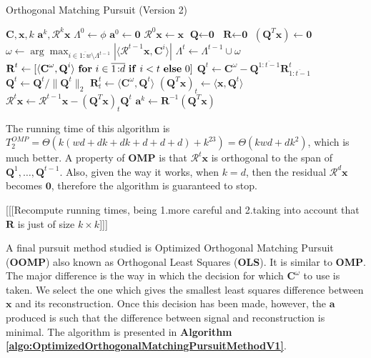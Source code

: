 \documentclass[12pt,a4paper,oneside,english]{UPBThesis}
\newcommand{\hctimes}[2]{{#1}\!\times\!{#2}}
\newcommand{\hcrange}[2]{\overline{{#1}\colon\!\!{#2}}}
\begin{document}
\begin{algorithm}
\caption{Orthogonal Matching Pursuit (Version 2)}
\label{algo:OrthogonalMatchingPursuitMethodV2}
\begin{algorithmic}
\Require $\textbf{C},\textbf{x},k$
\Ensure $\textbf{a}^k,\mathcal{R}^k\textbf{x}$
\State $\Lambda^0 \gets \phi$
\State $\textbf{a}^0 \gets \textbf{0}$
\State $\mathcal{R}^0\textbf{x} \gets \textbf{x}$
\State $\textbf{Q} \gets \textbf{0}$
\State $\textbf{R} \gets \textbf{0}$
\State $(\textbf{Q}^T\textbf{x}) \gets \textbf{0}$
\For {$t = \hcrange{1}{k}$}
\State $\omega \gets \arg \max_{i \in \hcrange{1}{w} \setminus \Lambda^{t-1}} \left| \langle \mathcal{R}^{t-1}\textbf{x} , \textbf{C}^i \rangle \right|$
\State $\Lambda^t \gets \Lambda^{t-1} \cup \omega$
\State $\textbf{R}^t \gets [ \langle \textbf{C}^\omega, \textbf{Q}^i \rangle~\mbox{\textbf{for} $i \in \hcrange{1}{d}$ \textbf{if} $i < t$ \textbf{else} $0$} ]$ 
\State $\textbf{Q}^t \gets \textbf{C}^\omega - \textbf{Q}^{\hcrange{1}{t-1}}\textbf{R}^t_{\hcrange{1}{t-1}}$ 
\State $\textbf{Q}^t \gets \textbf{Q}^t / \| \textbf{Q}^t \|_2$ 
\State $\textbf{R}^t_t \gets \langle \textbf{C}^\omega, \textbf{Q}^t \rangle$
\State $(\textbf{Q}^T\textbf{x})_t \gets \langle \textbf{x}, \textbf{Q}^t \rangle$
\State $\mathcal{R}^t\textbf{x} \gets \mathcal{R}^{t-1}\textbf{x} -  (\textbf{Q}^T\textbf{x})_t \textbf{Q}^t$
\EndFor
\State $\textbf{a}^k \gets \textbf{R}^{-1}(\textbf{Q}^T\textbf{x})$
\end{algorithmic}
\end{algorithm}

The running time of this algorithm is $T_2^{OMP} = \Theta(k(wd + dk + dk + d + d + d) + k^23) = \Theta(kwd + dk^2)$, which is much better. A property of \textbf{OMP} is that $\mathcal{R}^t\textbf{x}$ is orthogonal to the span of $\textbf{Q}^1,\dots,\textbf{Q}^{t-1}$. Also, given the way it works, when $k = d$, then the residual $\mathcal{R}^d\textbf{x}$ becomes $\textbf{0}$, therefore the algorithm is guaranteed to stop.

[[[Recompute running times, being 1.more careful and 2.taking into account that $\textbf{R}$ is just of size $\hctimes{k}{k}$]]]

A final pursuit method studied is Optimized Orthogonal Matching Pursuit (\textbf{OOMP}) also known as Orthogonal Least Squares (\textbf{OLS}). It is similar to \textbf{OMP}. The major difference is the way in which the decision for which $\textbf{C}^\omega$ to use is taken. We select the one which gives the smallest least squares difference between $\textbf{x}$ and its reconstruction. Once this decision has been made, however, the $\textbf{a}$ produced is such that the difference between signal and reconstruction is minimal. The algorithm is presented in \textbf{Algorithm \ref{algo:OptimizedOrthogonalMatchingPursuitMethodV1}}.
\end{document}
